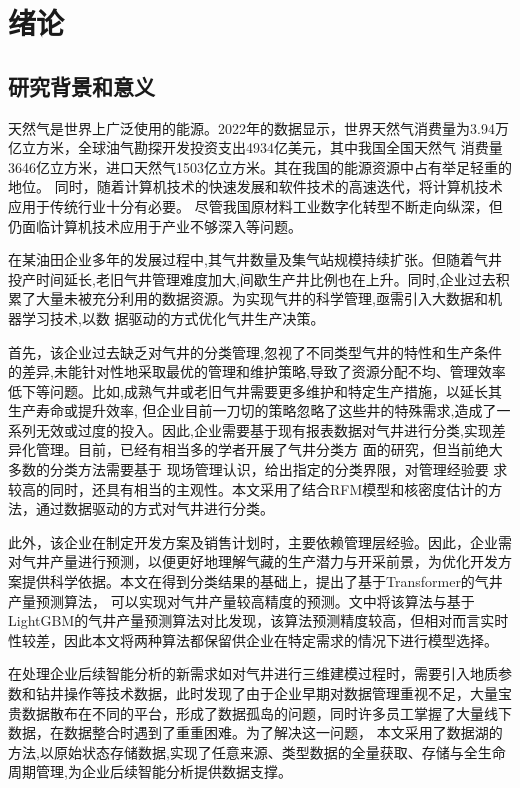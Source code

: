 \chapter{绪论}
\section{研究背景和意义}
天然气是世界上广泛使用的能源。2022年的数据显示，世界天然气消费量为3.94万亿立方米，全球油气勘探开发投资支出4934亿美元，其中我国全国天然气
消费量3646亿立方米，进口天然气1503亿立方米\cite{chinaGasGOv}。其在我国的能源资源中占有举足轻重的地位。
同时，随着计算机技术的快速发展和软件技术的高速迭代，将计算机技术应用于传统行业十分有必要。
尽管我国原材料工业数字化转型不断走向纵深，但仍面临计算机技术应用于产业不够深入等问题\cite{workplanForPetrochemical}。

在某油田企业多年的发展过程中,其气井数量及集气站规模持续扩张。但随着气井投产时间延长,老旧气井管理难度加大,间歇生产井比例也在上升。同时,企业过去积累了大量未被充分利用的数据资源。为实现气井的科学管理,亟需引入大数据和机器学习技术,以数
据驱动的方式优化气井生产决策。

首先，该企业过去缺乏对气井的分类管理,忽视了不同类型气井的特性和生产条件的差异,未能针对性地采取最优的管理和维护策略,导致了资源分配不均、管理效率低下等问题。比如,成熟气井或老旧气井需要更多维护和特定生产措施，以延长其生产寿命或提升效率,
但企业目前一刀切的策略忽略了这些井的特殊需求,造成了一系列无效或过度的投入。因此,企业需要基于现有报表数据对气井进行分类,实现差异化管理。目前，已经有相当多的学者开展了气井分类方
面的研究，但当前绝大多数的分类方法需要基于
现场管理认识，给出指定的分类界限，对管理经验要
求较高的同时，还具有相当的主观性\cite{SYZC202104015}。本文采用了结合RFM模型\cite{birant2011data}和核密度估计\cite{chen2017tutorial}的方法，通过数据驱动的方式对气井进行分类。

此外，该企业在制定开发方案及销售计划时，主要依赖管理层经验。因此，企业需对气井产量进行预测，以便更好地理解气藏的生产潜力与开采前景，为优化开发方案提供科学依据。本文在得到分类结果的基础上，提出了基于Transformer的气井产量预测算法，
可以实现对气井产量较高精度的预测。文中将该算法与基于LightGBM的气井产量预测算法对比发现，该算法预测精度较高，但相对而言实时性较差，因此本文将两种算法都保留供企业在特定需求的情况下进行模型选择。

在处理企业后续智能分析的新需求如对气井进行三维建模过程时，需要引入地质参数和钻井操作等技术数据，此时发现了由于企业早期对数据管理重视不足，大量宝贵数据散布在不同的平台，形成了数据孤岛的问题，同时许多员工掌握了大量线下数据，在数据整合时遇到了重重困难。为了解决这一问题，
本文采用了数据湖的方法,以原始状态存储数据,实现了任意来源、类型数据的全量获取、存储与全生命周期管理,为企业后续智能分析提供数据支撑。

